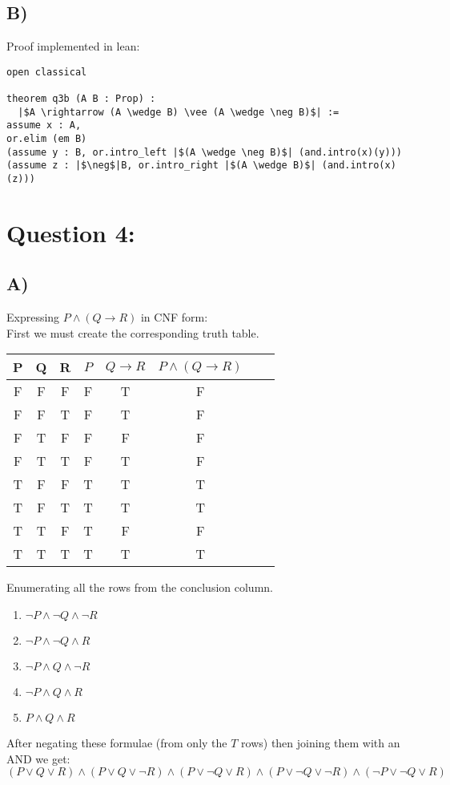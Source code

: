 \documentclass[a4paper]{article}
\begin{document}
\subsection*{B)}
Proof implemented in lean:
\begin{verbatim}
open classical

theorem q3b (A B : Prop) :
  |$A \rightarrow (A \wedge B) \vee (A \wedge \neg B)$| :=
assume x : A,
or.elim (em B)
(assume y : B, or.intro_left |$(A \wedge \neg B)$| (and.intro(x)(y)))
(assume z : |$\neg$|B, or.intro_right |$(A \wedge B)$| (and.intro(x)(z)))
\end{verbatim}

\section*{Question 4:}
\subsection*{A)}
Expressing $P \wedge (Q \rightarrow R)$ in CNF form: \\
First we must create the corresponding truth table.
\begin{table}[ht]
\centering
\def\arraystretch{1.5}
\begin{tabular}{|c|c|c|c|c|c|c|c|}
\hline
P & Q & R & $P$ & $Q \rightarrow R$ & $P \wedge (Q \rightarrow R)$  \\ \hline
F & F & F & F & T & F  \\
F & F & T & F & T & F  \\
F & T & F & F & F & F  \\
F & T & T & F & T & F  \\
T & F & F & T & T & T  \\
T & F & T & T & T & T  \\
T & T & F & T & F & F  \\
T & T & T & T & T & T  \\ \hline
\end{tabular}
\end{table}
\newpage
Enumerating all the rows from the conclusion column.
\begin{enumerate}
\item $\neg P \wedge \neg Q \wedge \neg R$
\item $\neg P \wedge \neg Q \wedge R$
\item $\neg P \wedge Q \wedge \neg R$
\item $\neg P \wedge Q \wedge R$
\item $ P \wedge Q \wedge R$
\end{enumerate}
After negating these formulae (from only the $T$ rows) then joining them with an AND we get:
$$(P\vee Q \vee R) \wedge (P \vee Q \vee \neg R) \wedge (P \vee \neg Q \vee R) \wedge (P \vee \neg Q \vee \neg R) \wedge (\neg P \vee \neg Q \vee R)$$
\end{document}
